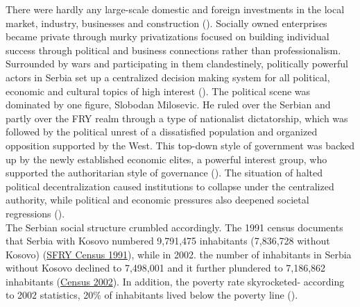 \documentclass[11pt]{report}
\begin{document}
There were hardly any large-scale domestic and foreign investments in the local market, industry, businesses and construction (\href{Vujosevic}{\citealt{vujosevic_planning_2006}}).
Socially owned enterprises became private through murky privatizations focused on building individual success through political and business connections rather than professionalism.
Surrounded by wars and participating in them clandestinely, politically powerful actors in Serbia set up a centralized decision making system for all political, economic and cultural topics of high interest (\href{Nedovic}{\citealt{nedovic-budic_mornings_2011}}).
The political scene was dominated by one figure, Slobodan Milosevic. He ruled over the Serbian and partly over the FRY realm through a type of nationalist dictatorship, which was followed by the political unrest of a dissatisfied population and organized opposition supported by the West. This top-down style of government was backed up by the newly established economic elites, a powerful interest group, who supported the authoritarian style of governance (\href{Vujovic}{\citealt{vujovic_belgrades_2007}}).
The situation of halted political decentralization caused institutions to collapse under the centralized authority, while political and economic pressures also deepened societal regressions (\href{Nedovic}{\citealt{nedovic-budic_mornings_2011}}). 
\\

The Serbian social structure crumbled accordingly. The 1991 census documents that Serbia with Kosovo numbered 9,791,475 inhabitants (7,836,728 without Kosovo) (\href{ref}{SFRY Census 1991}), while in 2002. the number of inhabitants in Serbia without Kosovo declined to 7,498,001 and it further plundered to 7,186,862 inhabitants (\href{ref}{Census 2002}).
In addition, the poverty rate skyrocketed- according to 2002 statistics, 20\% of inhabitants lived below the poverty line (\href{Vlada}{\citealt{strategija_vlade_r._srbije_strategija_2003}}).
\\
\end{document}
